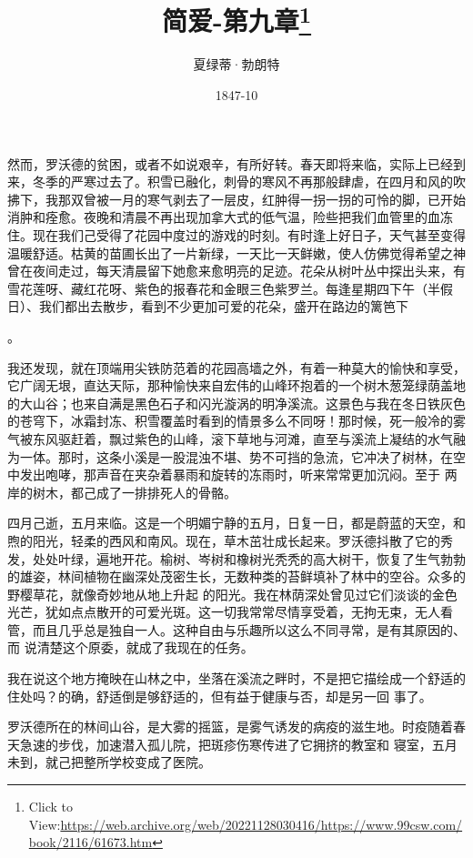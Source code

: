 \documentclass{article}
\title{简爱-第九章\footnote{Click to View:\url{https://web.archive.org/web/20221128030416/https://www.99csw.com/book/2116/61673.htm}}}
\author{夏绿蒂·勃朗特}
\date{1847-10}
\begin{document}

\maketitle


\Large

﻿然而，罗沃德的贫困，或者不如说艰辛，有所好转。春天即将来临，实际上已经到来，冬季的严寒过去了。积雪已融化，刺骨的寒风不再那般肆虐，在四月和风的吹拂下，我那双曾被一月的寒气剥去了一层皮，红肿得一拐一拐的可怜的脚，已开始消肿和痊愈。夜晚和清晨不再出现加拿大式的低气温，险些把我们血管里的血冻住。现在我们己受得了花园中度过的游戏的时刻。有时逢上好日子，天气甚至变得温暖舒适。枯黄的苗圃长出了一片新绿，一天比一天鲜嫩，使人仿佛觉得希望之神曾在夜间走过，每天清晨留下她愈来愈明亮的足迹。花朵从树叶丛中探出头来，有雪花莲呀、藏红花呀、紫色的报春花和金眼三色紫罗兰。每逢星期四下午（半假日）、我们都出去散步，看到不少更加可爱的花朵，盛开在路边的篱笆下

\newpage
。 

我还发现，就在顶端用尖铁防范着的花园高墙之外，有着一种莫大的愉快和享受，它广阔无垠，直达天际，那种愉快来自宏伟的山峰环抱着的一个树木葱笼绿荫盖地的大山谷；也来自满是黑色石子和闪光漩涡的明净溪流。这景色与我在冬日铁灰色的苍穹下，冰霜封冻、积雪覆盖时看到的情景多么不同呀！那时候，死一般冷的雾气被东风驱赶着，飘过紫色的山峰，滚下草地与河滩，直至与溪流上凝结的水气融为一体。那时，这条小溪是一股混浊不堪、势不可挡的急流，它冲决了树林，在空中发出咆哮，那声音在夹杂着暴雨和旋转的冻雨时，听来常常更加沉闷。至于
两岸的树木，都己成了一排排死人的骨骼。 

四月己逝，五月来临。这是一个明媚宁静的五月，日复一日，都是蔚蓝的天空，和煦的阳光，轻柔的西风和南风。现在，草木茁壮成长起来。罗沃德抖散了它的秀发，处处叶绿，遍地开花。榆树、岑树和橡树光秃秃的高大树干，恢复了生气勃勃的雄姿，林间植物在幽深处茂密生长，无数种类的苔鲜填补了林中的空谷。众多的野樱草花，就像奇妙地从地上升起
\newpage
的阳光。我在林荫深处曾见过它们淡谈的金色光芒，犹如点点散开的可爱光斑。这一切我常常尽情享受着，无拘无束，无人看管，而且几乎总是独自一人。这种自由与乐趣所以这么不同寻常，是有其原因的、而
说清楚这个原委，就成了我现在的任务。 

我在说这个地方掩映在山林之中，坐落在溪流之畔时，不是把它描绘成一个舒适的住处吗？的确，舒适倒是够舒适的，但有益于健康与否，却是另一回
事了。 

罗沃德所在的林间山谷，是大雾的摇篮，是雾气诱发的病疫的滋生地。时疫随着春天急速的步伐，加速潜入孤儿院，把斑疹伤寒传进了它拥挤的教室和
寝室，五月未到，就己把整所学校变成了医院。 
\end{document}
